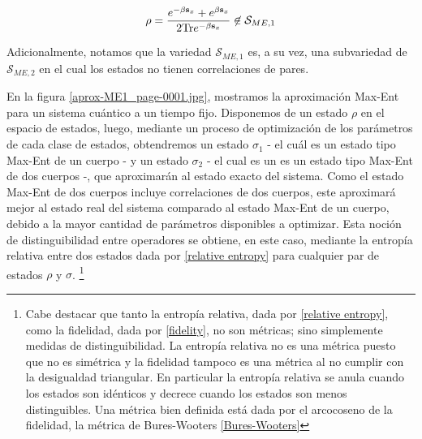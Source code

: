 \documentclass{report} %
\numberwithin{equation}{section}
\begin{document}
$$
\rho=\frac{e^{- \beta{\bf s}_x}+e^{\beta{\mathbf s}_x}}{2 \mathrm{Tr}e^{- \beta{\mathbf s}_x}} \not\in 
\mathcal{S}_{ME,1}
$$

Adicionalmente, notamos que la variedad $\mathcal{S}_{ME,1}$ es, a su vez, una subvariedad de $\mathcal{S}_{ME,2}$ en el cual los estados no tienen correlaciones de pares. 

En la figura \ref{aprox-ME1_page-0001.jpg}, mostramos la aproximación Max-Ent para un sistema cuántico a un tiempo fijo. Disponemos de un estado $\rho$ en el espacio de estados, luego, mediante un proceso de optimización de los parámetros de cada clase de estados, obtendremos un estado $\sigma_1$ - el cuál es un estado tipo Max-Ent de un cuerpo - y un estado $\sigma_2$ - el cual es un es un estado tipo Max-Ent de dos cuerpos -, que aproximarán al estado exacto del sistema. Como el estado Max-Ent de dos cuerpos incluye correlaciones de dos cuerpos, este aproximará mejor al estado real del sistema comparado al estado Max-Ent de un cuerpo, debido a la mayor cantidad de parámetros disponibles a optimizar. Esta noción de distinguibilidad entre operadores se obtiene, en este caso, mediante la entropía relativa entre dos estados dada por \ref{relative entropy} para cualquier par de estados $\rho$ y $\sigma$. \footnote{Cabe destacar que tanto la entropía relativa, dada por \eqref{relative entropy}, como la fidelidad, dada por \eqref{fidelity}, no son métricas; sino simplemente medidas de distinguibilidad. La entropía relativa no es una métrica puesto que no es simétrica y la fidelidad tampoco es una métrica al no cumplir con la desigualdad triangular. En particular la entropía relativa se anula cuando los estados son idénticos y decrece cuando los estados son menos distinguibles. Una métrica bien definida está dada por el arcocoseno de la fidelidad, la métrica de Bures-Wooters \eqref{Bures-Wooters} }
\end{document}
